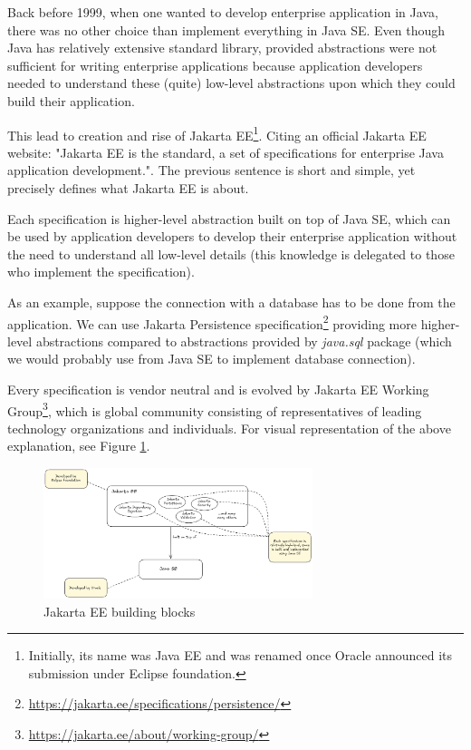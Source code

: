 \documentclass[../main.tex]{subfiles}
\begin{document}
Back before 1999, when one wanted to develop enterprise application in Java, there was no other choice than implement everything in Java SE. Even though Java has relatively extensive standard library, provided abstractions were not sufficient for writing enterprise applications because application developers needed to understand these (quite) low-level abstractions upon which they could build their application.

This lead to creation and rise of Jakarta EE\footnote{Initially, its name was Java EE and was renamed once Oracle announced its submission under Eclipse foundation.}. Citing an official Jakarta EE website: "Jakarta EE is the standard, a set of specifications for enterprise Java application development."\cite{jakartaee}. The previous sentence is short and simple, yet precisely defines what Jakarta EE is about.

Each specification is higher-level abstraction built on top of Java SE, which can be used by application developers to develop their enterprise application without the need to understand all low-level details (this knowledge is delegated to those who implement the specification).

As an example, suppose the connection with a database has to be done from the application. We can use Jakarta Persistence specification\footnote{\url{https://jakarta.ee/specifications/persistence/}} providing more higher-level abstractions compared to abstractions provided by \textit{java.sql} package (which we would probably use from Java SE to implement database connection).

Every specification is vendor neutral and is evolved by Jakarta EE Working Group\footnote{\url{https://jakarta.ee/about/working-group/}}, which is global community consisting of representatives of leading technology organizations and individuals. For visual representation of the above explanation, see Figure \ref{fig:jakarta-ee}.

\begin{figure}
  \begin{center}
    \includegraphics[width=0.7\textwidth]{images/jakarta-ee.png}
  \end{center}
  \caption{Jakarta EE building blocks}
  \label{fig:jakarta-ee}
\end{figure}
\end{document}
